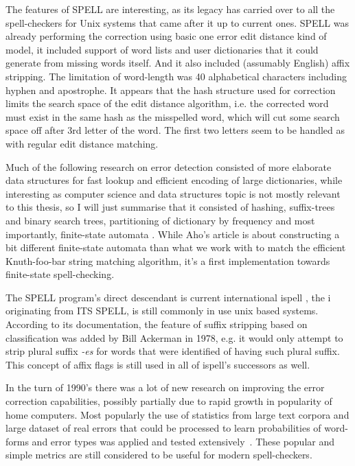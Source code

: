 \documentclass[officiallayout]{unihelcompling}
\begin{document}
The features of SPELL are interesting, as its legacy has carried over to all
the spell-checkers for Unix systems that came after it up to current ones.
SPELL was already performing the correction using basic one error edit distance
kind of model, it included support of word lists and user dictionaries that it
could generate from missing words itself. And it also included (assumably
English) affix stripping. The limitation of
word-length was 40 alphabetical characters including hyphen and apostrophe. It
appears that the hash structure used for correction limits the search space of
the edit distance algorithm, i.e. the corrected word must exist in the same
hash as the misspelled word, which will cut some search space off after 3rd
letter of the word. The first two letters seem to be handled as with regular
edit distance matching. \citep{gorin1971spell}

Much of the following research on error detection consisted of more elaborate
data structures for fast lookup and efficient encoding of large dictionaries,
while interesting as computer science and data structures topic is not mostly
relevant to this thesis, so I will just summarise that it consisted of hashing,
suffix-trees and binary search trees, partitioning of dictionary by frequency
\citep{knuth1973art} and most importantly, finite-state automata
\citep{aho1975efficient}. While Aho's article is about constructing a bit
different finite-state automata than what we work with to match the
efficient Knuth-foo-bar string matching algorithm, it's
a first implementation towards finite-state spell-checking.

The SPELL program's direct descendant is current international ispell
\citep{gorin1971spell}, the i originating from ITS SPELL, is still commonly in
use unix based systems. According to its documentation, the feature of suffix
stripping based on classification was added by Bill Ackerman in 1978, e.g. it
would only attempt to strip plural suffix \emph{-es} for words that were
identified of having such plural suffix.  This concept of affix flags is still
used in all of ispell's successors as well.

In the turn of 1990's there was a lot of new research on improving the error
correction capabilities, possibly partially due to rapid growth in popularity
of home computers. Most popularly the use of statistics from large text corpora
and large dataset of real errors that could be processed to learn probabilities
of word-forms and error types was applied and tested
extensively~\citep{kernighan1990spelling,church1991probability}. These popular
and simple metrics are still considered to be useful for modern spell-checkers.
\end{document}
